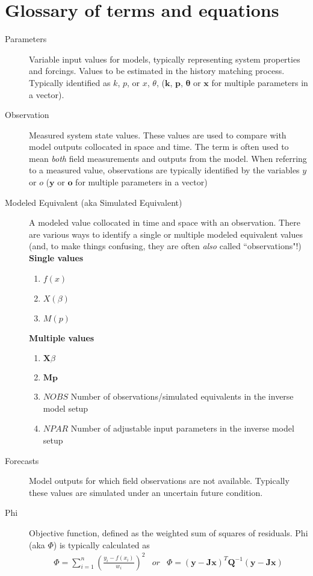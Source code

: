 \documentclass[english]{article}
\begin{document}
\section*{Glossary of terms and equations}
\begin{description}
\item [Parameters] Variable input values for models, typically representing system properties and forcings. Values to be estimated in the history matching process. Typically identified as $k$, $p$, or $x$, $\theta$, ($\mathbf{k}$, $\mathbf{p}$, $\boldsymbol{\theta}$ or $\mathbf{x}$ for multiple parameters in a vector).
\item [Observation] Measured system state values. These values are used to compare with model outputs collocated in space and time. The term is often used to mean \emph{both} field measurements and outputs from the model. When referring to a measured value, observations are typically identified by the variables $y$ or $o$  ($\mathbf{y}$ or $\mathbf{o}$ for multiple parameters in a vector)
\item [Modeled Equivalent (aka Simulated Equivalent)] A modeled value collocated in time and space with an observation. There are various ways to identify a single or multiple modeled equivalent values (and, to make things confusing, they are often \emph{also} called ``observations"!)  \newline{}
\textbf{Single values} 
\begin{enumerate}
\item $f\left(x\right)$
\item $X\left(\beta\right)$
\item $M\left(p\right)$
\end{enumerate}
\textbf{Multiple values}
\begin{enumerate}
\item $\mathbf{X}\beta$
\item $\mathbf{M}\mathbf{p}$
\item ${NOBS}$ Number of observations/simulated equivalents in the inverse model setup
\item ${NPAR}$ Number of adjustable input parameters in the inverse model setup

\end{enumerate}
\item [Forecasts] Model outputs for which field observations are not available. Typically these values are simulated under an uncertain future condition.
\item [Phi] Objective function, defined as the weighted sum of squares of residuals. Phi (aka $\Phi$) is typically calculated as
\begin{equation}
\begin{array}{ccc}
 \Phi=\sum_{i=1}^{n}\left(\frac{y_{i}-f\left(x_{i}\right)}{w_{i}}\right)^{2} & or & \Phi=\left(\mathbf{y}-\mathbf{Jx}\right)^{T}\mathbf{Q}^{-1}\left(\mathbf{y}-\mathbf{Jx}\right)
 \end{array}
\end{equation}


\end{description}
\end{document}
